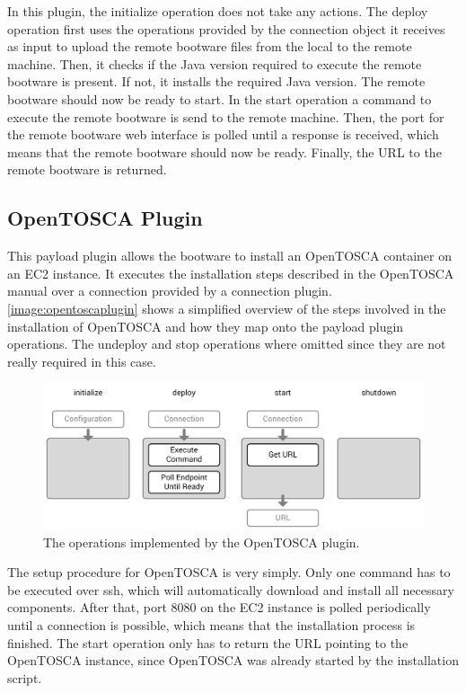 In this plugin, the initialize operation does not take any actions.
The deploy operation first uses the operations provided by the connection object it receives as input to upload the remote bootware files from the local to the remote machine.
Then, it checks if the Java version required to execute the remote bootware is present.
If not, it installs the required Java version.
The remote bootware should now be ready to start.
In the start operation a command to execute the remote bootware is send to the remote machine.
Then, the port for the remote bootware web interface is polled until a response is received, which means that the remote bootware should now be ready.
Finally, the URL to the remote bootware is returned.

\subsection{OpenTOSCA Plugin}

This payload plugin allows the bootware to install an OpenTOSCA container on an EC2 instance.
It executes the installation steps described in the OpenTOSCA manual over a connection provided by a connection plugin.
\autoref{image:opentoscaplugin} shows a simplified overview of the steps involved in the installation of OpenTOSCA and how they map onto the payload plugin operations.
The undeploy and stop operations where omitted since they are not really required in this case.

\begin{figure}[!htbp]
	\centering
	\includegraphics[resolution=600]{implementation/assets/opentosca_plugin}
	\caption{The operations implemented by the OpenTOSCA plugin.}
	\label{image:opentoscaplugin}
\end{figure}

The setup procedure for OpenTOSCA is very simply.
Only one command has to be executed over ssh, which will automatically download and install all necessary components.
After that, port 8080 on the EC2 instance is polled periodically until a connection is possible, which means that the installation process is finished.
The start operation only has to return the URL pointing to the OpenTOSCA instance, since OpenTOSCA was already started by the installation script.


